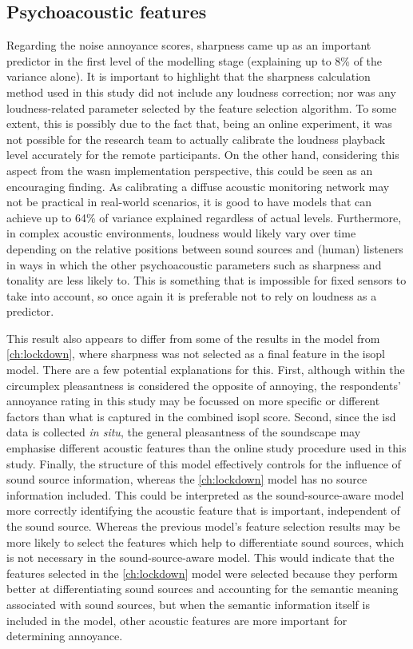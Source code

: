 \subsection{Psychoacoustic features}

Regarding the noise annoyance scores, sharpness came up as an important predictor in the first level of the modelling stage (explaining up to 8\% of the variance alone). It is important to highlight that the sharpness calculation method used in this study did not include any loudness correction; nor was any loudness-related parameter selected by the feature selection algorithm. To some extent, this is possibly due to the fact that, being an online experiment, it was not possible for the research team to actually calibrate the loudness playback level accurately for the remote participants. On the other hand, considering this aspect from the \gls{wasn} implementation perspective, this could be seen as an encouraging finding. As calibrating a diffuse acoustic monitoring network may not be practical in real-world scenarios, it is good to have models that can achieve up to 64\% of variance explained regardless of actual levels. Furthermore, in complex acoustic environments, loudness would likely vary over time depending on the relative positions between sound sources and (human) listeners in ways in which the other psychoacoustic parameters such as sharpness and tonality are less likely to. This is something that is impossible for fixed sensors to take into account, so once again it is preferable not to rely on loudness as a predictor.

This result also appears to differ from some of the results in the model from \cref{ch:lockdown}, where sharpness was not selected as a final feature in the \gls{isopl} model. There are a few potential explanations for this. First, although within the circumplex pleasantness is considered the opposite of annoying, the respondents' annoyance rating in this study may be focussed on more specific or different factors than what is captured in the combined \gls{isopl} score. Second, since the \gls{isd} data is collected \textit{in situ}, the general pleasantness of the soundscape may emphasise different acoustic features than the online study procedure used in this study. Finally, the structure of this model effectively controls for the influence of sound source information, whereas the \cref{ch:lockdown} model has no source information included. This could be interpreted as the sound-source-aware model more correctly identifying the acoustic feature that is important, independent of the sound source. Whereas the previous model's feature selection results may be more likely to select the features which help to differentiate sound sources, which is not necessary in the sound-source-aware model. This would indicate that the features selected in the \cref{ch:lockdown} model were selected because they perform better at differentiating sound sources and accounting for the semantic meaning associated with sound sources, but when the semantic information itself is included in the model, other acoustic features are more important for determining annoyance. 


